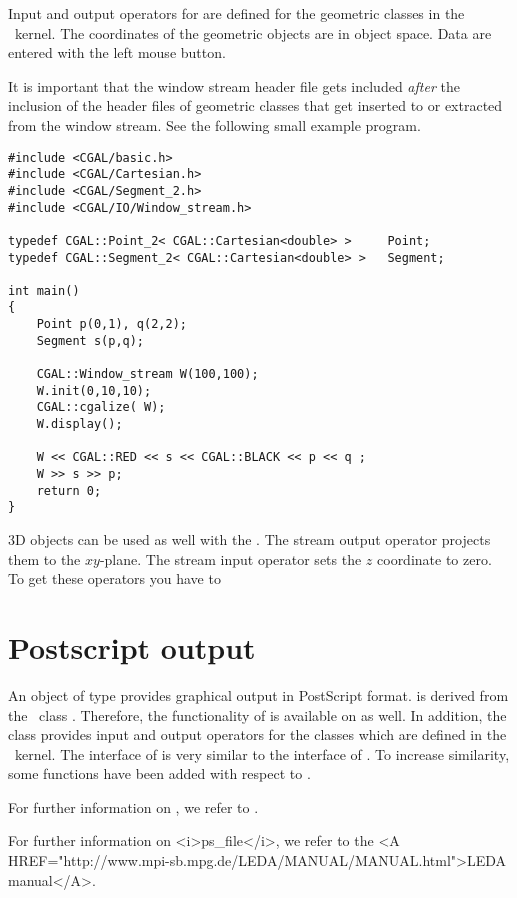 Input and output operators for  are defined for 
the geometric classes in the \cgal\ kernel.
The coordinates of the geometric objects are in object space. Data are
entered with the left mouse button.

It is important that the window stream header file gets included
{\em after} the inclusion of the header files of geometric classes
that get inserted to or extracted from the window stream. See the following 
small example program.

\begin{verbatim}
#include <CGAL/basic.h>
#include <CGAL/Cartesian.h>
#include <CGAL/Segment_2.h>
#include <CGAL/IO/Window_stream.h>

typedef CGAL::Point_2< CGAL::Cartesian<double> >     Point;
typedef CGAL::Segment_2< CGAL::Cartesian<double> >   Segment;

int main()
{
    Point p(0,1), q(2,2);
    Segment s(p,q);

    CGAL::Window_stream W(100,100);
    W.init(0,10,10);
    CGAL::cgalize( W);
    W.display();

    W << CGAL::RED << s << CGAL::BLACK << p << q ;
    W >> s >> p;
    return 0;
}
\end{verbatim} 

3D objects can be used as well with the . The stream output
operator \ccc{<<} projects them to the $xy$-plane. The stream input
operator \ccc{>>} sets the $z$ coordinate to zero.
To get these operators you have to 



\section{Postscript output}

An object of type  provides graphical output in PostScript
format.
 is derived from the \leda\ class .
Therefore, the functionality of  is available on 
as well.
In addition, the class  provides input and output 
operators for the classes which are defined in the \cgal\ kernel.
The interface of  is very similar to the interface 
of . 
To increase similarity, some functions have been added with respect to .
\begin{ccTexOnly}
For further information on , we refer to \cite{mnsu-lum}.
\end{ccTexOnly}
\begin{ccHtmlOnly}
For further information on <i>ps_file</i>, we refer to the 
<A HREF="http://www.mpi-sb.mpg.de/LEDA/MANUAL/MANUAL.html">LEDA manual</A>.
\end{ccHtmlOnly}

